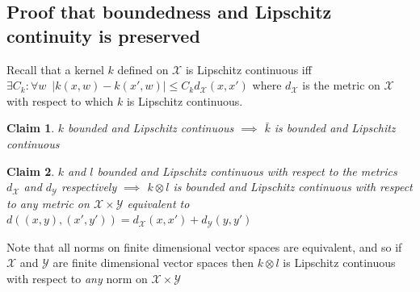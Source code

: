 \documentclass[]{article}
\newtheorem{claim}{Claim}
\newenvironment{claimproof}[1]{\par\noindent\underline{Proof:}\space#1}{\hfill $\blacksquare$}
\begin{document}
\subsection{Proof that boundedness and Lipschitz continuity is preserved}\label{supp:bounded-and-lipschitz}
Recall that a kernel $k$ defined on $\mathcal{X}$ is Lipschitz continuous iff $\exists C_k : \forall w \enspace |k(x,w) - k(x',w)| \leq C_k d_\mathcal{X}(x,x')$ where $d_\mathcal{X}$ is the metric on $\mathcal{X}$ with respect to which $k$ is Lipschitz continuous.

\begin{claim}
$k$ bounded and Lipschitz continuous $\implies$ $\bar{k}$ is bounded and Lipschitz continuous
\end{claim}

\begin{claim}
$k$ and $l$ bounded and Lipschitz continuous with respect to the metrics $d_\mathcal{X}$ and $d_\mathcal{Y}$ respectively $\implies$ $k\otimes l$ is bounded and Lipschitz continuous with respect to any metric on $\mathcal{X}\times \mathcal{Y}$ equivalent to $d \left( (x,y),(x',y') \right) =  d_\mathcal{X}(x,x') + d_\mathcal{Y}(y,y')$
\end{claim}

Note that all norms on finite dimensional vector spaces are equivalent, and so if $\mathcal{X}$ and $\mathcal{Y}$ are finite dimensional vector spaces then $k\otimes l$ is Lipschitz continuous with respect to \emph{any} norm on $\mathcal{X}\times \mathcal{Y}$
\end{document}
